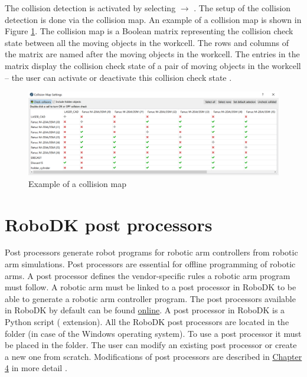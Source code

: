 The collision detection is activated by selecting  $\rightarrow$ . The setup of the collision detection is done via the collision map. An example of a collision map is shown in Figure \ref{fig:collisionmap}. The collision map is a Boolean matrix representing the collision check state between all the moving objects in the workcell. The rows and columns of the matrix are named after the moving objects in the workcell. The entries in the matrix display the collision check state of a pair of moving objects in the workcell -- the user can activate or deactivate this collision check state \cite{robodkcollision}.

\begin{figure}[h]
    \centering
    \includegraphics[width=1.0\linewidth]{img/collision_map.PNG}
    \caption{Example of a collision map}
    \label{fig:collisionmap}
\end{figure}

\section{RoboDK post processors}

Post processors generate robot programs for robotic arm controllers from robotic arm simulations. Post processors are essential for offline programming of robotic arms. A post processor defines the vendor-specific rules a robotic arm program must follow. A robotic arm must be linked to a post processor in RoboDK to be able to generate a robotic arm controller program. The post processors available in RoboDK by default can be found \href{https://robodk.com/doc/en/Post-Processors.html#AvailablePosts}{online}.  
A post processor in RoboDK is a Python script ( extension). All the RoboDK post processors are located in the
 folder (in case of the Windows operating system).  To use a post processor it must be placed in the  folder. The user can modify an existing post processor or create a new one from scratch. Modifications of post processors are described in \hyperref[chap:implementation]{Chapter 4} in more detail \cite{robodkposts}. 
